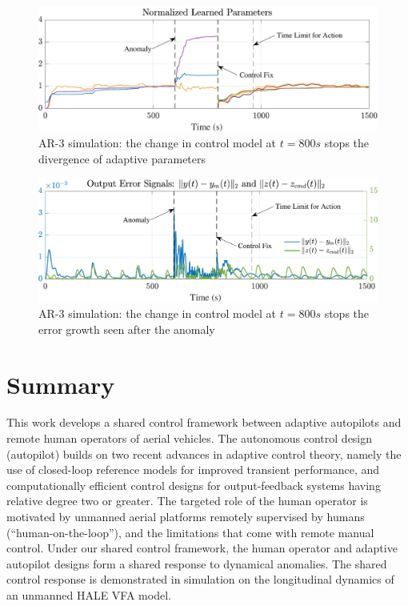\documentclass[english]{ifacconf}
\begin{document}
\begin{figure}[htbp]
	\centering
	\includegraphics[width=\columnwidth]{../fig/ar3-params.pdf}
	\caption{AR-3 simulation: the change in control model at $t = 800 s$ stops the divergence of adaptive parameters}
	\label{fig:ar3-params}
\end{figure}

\begin{figure}[htbp]
	\centering
	\includegraphics[width=\columnwidth]{../fig/ar3-err.pdf}
	\caption{AR-3 simulation: the change in control model at $t = 800 s$ stops the error growth seen after the anomaly}
	\label{fig:ar3-err}
\end{figure}

\section{Summary}\label{sec:summary}
This work develops a shared control framework between adaptive autopilots and remote human operators of aerial vehicles. The autonomous control design (autopilot) builds on two recent advances in adaptive control theory, namely the use of closed-loop reference models for improved transient performance, and computationally efficient control designs for output-feedback systems having relative degree two or greater. The targeted role of the human operator is motivated by unmanned aerial platforms remotely supervised by humans (``human-on-the-loop''), and the limitations that come with remote manual control. Under our shared control framework, the human operator and adaptive autopilot designs form a shared response to dynamical anomalies. The shared control response is demonstrated in simulation on the longitudinal dynamics of an unmanned HALE VFA model. 
\end{document}
